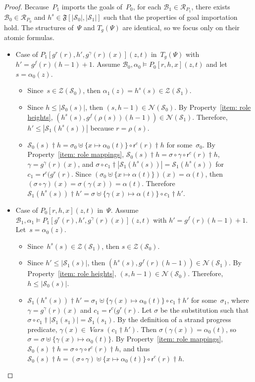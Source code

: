 \documentclass[12pt]{article}
\newcommand{\fn}[1]{\ensuremath{\operatorname{\mathit{#1}}}}
\newcommand{\vars}{\fn{Vars}}
\newcommand{\prefix}[2]{#1\dagger#2}
\newcommand{\alg}[1]{\ensuremath{\mathfrak{#1}}}
\newcommand{\ssp}{\ensuremath{\mathcal{S}}}
\newcommand{\bun}{\ensuremath{\mathcal{B}}}
\newcommand{\strands}{\ensuremath{\mathcal{Z}}}
\newcommand{\nodes}{\ensuremath{\mathcal{N}}}
\newcommand{\run}{\mathcal{R}}
\newcommand{\rl}{\ensuremath{\rho}}
\newcommand{\role}{\mathsf{r}}
\begin{document}
\begin{proof}
Because~$P_1$ imports the goals of~$P_0$, for each
$\bun_1\in\run_{P_1}$, there exists $\bun_0\in\run_{P_0}$ and
$h^s\in\alg{F}[|\ssp_0|, |\ssp_1|]$ such that the properties of goal
importation hold.  The structures of~$\Psi$ and $T_g(\Psi)$ are
identical, so we focus only on their atomic formulas.

\begin{itemize}
\item Case of $P_1[g^r(r),h',g^\gamma(r)(x)](z,t)$ in~$T_g(\Psi)$ with
  $h'=g^f(r)(h-1)+1$.  Assume $\bun_0,\alpha_0\models P_0[r,h,x](z,t)$
  and let~$s=\alpha_0(z)$.
  \begin{itemize}
  \item Since~$s\in\strands(\ssp_0)$, then
    $\alpha_1(z)=h^s(s)\in\strands(\ssp_1)$.
  \item Since $h\leq|\ssp_0(s)|$, then $(s,h-1)\in\nodes(\ssp_0)$.  By
    Property~\ref{item: role heights},
    $(h^s(s),g^f(\rl(s))(h-1))\in\nodes(\ssp_1)$.  Therefore,
    $h'\leq|\ssp_1(h^s(s))|$ because $r=\rl(s)$.
  \item
    $\prefix{\ssp_0(s)}{h}=\sigma_0\uplus\{x\mapsto\alpha_0(t)\}\circ
    \prefix{\role^{c}(r)}{h}$ for some~$\sigma_0$.  By
    Property~\ref{item: role mappings},
    $\prefix{\ssp_0(s)}{h}=\sigma\circ\gamma\circ\prefix{\role^c(r)}{h}$,
    $\gamma=g^\gamma(r)(x)$, and
    $\sigma\circ\prefix{c_1}{|\ssp_1(h^s(s))|}=\ssp_1(h^s(s))$ for
    $c_1=\role^c(g^r(r)$.  Since
    $(\sigma_0\uplus\{x\mapsto\alpha(t)\})(x)=\alpha(t)$, then
    $(\sigma\circ\gamma)(x) =\sigma(\gamma(x))=\alpha(t)$.
    Therefore $\prefix{\ssp_1(h^s(s))}{h'}=\sigma\uplus
    \{\gamma(x)\mapsto\alpha(t)\}\circ \prefix{c_1}{h'}$.
  \end{itemize}

\item Case of $P_0[r,h,x](z,t)$ in~$\Psi$.  Assume $\bun_1,\alpha_1\models
  P_1[g^r(r),h',g^\gamma(r)(x)](z,t)$ with
  $h'=g^f(r)(h-1)+1$.  Let~$s=\alpha_0(z)$.
  \begin{itemize}
  \item Since~$h^s(s)\in\strands(\ssp_1)$, then
    $s\in\strands(\ssp_0)$.
  \item Since $h'\leq|\ssp_1(s)|$, then
    $(h^s(s),g^f(r)(h-1))\in\nodes(\ssp_1)$. By Property~\ref{item:
    role heights}, $(s,h-1)\in\nodes(\ssp_0)$.  Therefore,
    $h\leq|\ssp_0(s)|$.
  \item
    $\prefix{\ssp_1(h^s(s))}{h'}=
    \sigma_1\uplus\{\gamma(x)\mapsto\alpha_0(t)\}\circ
    \prefix{c_1}{h'}$ for some~$\sigma_1$, where
    $\gamma=g^\gamma(r)(x)$ and $c_1=\role^c(g^r(r)$.  Let $\sigma$ be
    the substitution such that
    $\sigma\circ\prefix{c_1}{|\ssp_1(s_1)|}=\ssp_1(s_1)$.  By the
    definition of a strand progress predicate,
    $\gamma(x)\in\vars(\prefix{c_1}{h'})$.  Then
    $\sigma(\gamma(x))=\alpha_0(t)$, so
    $\sigma=\sigma\uplus\{\gamma(x)\mapsto\alpha_0(t)\}$.  By
    Property~\ref{item: role mappings},
    $\prefix{\ssp_0(s)}{h}=\sigma\circ\gamma\circ\prefix{\role^c(r)}{h}$,
    and thus
    $\prefix{\ssp_0(s)}{h}=(\sigma\circ\gamma)\uplus\{x\mapsto\alpha_0(t)\}\circ
    \prefix{\role^{c}(r)}{h}$.
  \end{itemize}


\end{itemize}
\end{proof}
\end{document}
